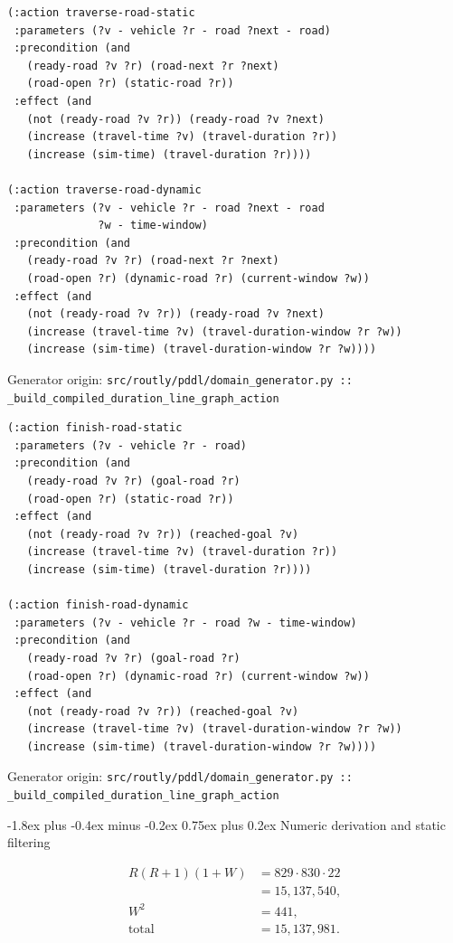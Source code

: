 \documentclass[11pt,a4paper]{article}
\makeatletter
\renewcommand{\subsection}{\@startsection{subsection}{2}{0pt}
  {-1.8ex plus -0.4ex minus -0.2ex}
  {0.75ex plus 0.2ex}
  {\normalfont\large\bfseries\color{RoutlyNavy}}}
\newcommand{\codeorigin}[1]{%
  {\footnotesize\textcolor{RoutlyMuted}{Generator origin: \texttt{#1}}\par}
}
\makeatother
\begin{document}
\begin{lstlisting}
(:action traverse-road-static
 :parameters (?v - vehicle ?r - road ?next - road)
 :precondition (and
   (ready-road ?v ?r) (road-next ?r ?next)
   (road-open ?r) (static-road ?r))
 :effect (and
   (not (ready-road ?v ?r)) (ready-road ?v ?next)
   (increase (travel-time ?v) (travel-duration ?r))
   (increase (sim-time) (travel-duration ?r))))

(:action traverse-road-dynamic
 :parameters (?v - vehicle ?r - road ?next - road
              ?w - time-window)
 :precondition (and
   (ready-road ?v ?r) (road-next ?r ?next)
   (road-open ?r) (dynamic-road ?r) (current-window ?w))
 :effect (and
   (not (ready-road ?v ?r)) (ready-road ?v ?next)
   (increase (travel-time ?v) (travel-duration-window ?r ?w))
   (increase (sim-time) (travel-duration-window ?r ?w))))
\end{lstlisting}
\codeorigin{src/routly/pddl/domain\_generator.py :: \_build\_compiled\_duration\_line\_graph\_action}

\begin{lstlisting}
(:action finish-road-static
 :parameters (?v - vehicle ?r - road)
 :precondition (and
   (ready-road ?v ?r) (goal-road ?r)
   (road-open ?r) (static-road ?r))
 :effect (and
   (not (ready-road ?v ?r)) (reached-goal ?v)
   (increase (travel-time ?v) (travel-duration ?r))
   (increase (sim-time) (travel-duration ?r))))

(:action finish-road-dynamic
 :parameters (?v - vehicle ?r - road ?w - time-window)
 :precondition (and
   (ready-road ?v ?r) (goal-road ?r)
   (road-open ?r) (dynamic-road ?r) (current-window ?w))
 :effect (and
   (not (ready-road ?v ?r)) (reached-goal ?v)
   (increase (travel-time ?v) (travel-duration-window ?r ?w))
   (increase (sim-time) (travel-duration-window ?r ?w))))
\end{lstlisting}
\codeorigin{src/routly/pddl/domain\_generator.py :: \_build\_compiled\_duration\_line\_graph\_action}

\subsection{Numeric derivation and static filtering}

\[
\begin{aligned}
R(R+1)(1+W)
&=829\cdot830\cdot22\\
&=15{,}137{,}540,\\
W^2&=441,\\
\text{total}&=15{,}137{,}981.
\end{aligned}
\]
\end{document}
